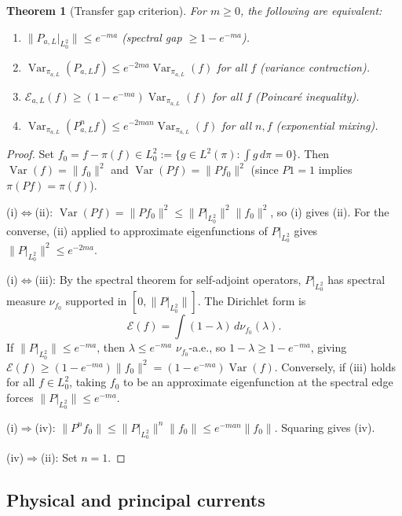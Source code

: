 \documentclass[12pt]{article}
\theoremstyle{plain}
\newtheorem{theorem}{Theorem}[section]
\theoremstyle{definition}
\numberwithin{equation}{section}
\newcommand{\Var}{\operatorname{Var}}
\begin{document}
\begin{theorem}[Transfer gap criterion]\label{thm:transfergap}
For $m\geq 0$, the following are equivalent:
\begin{enumerate}[label=(\roman*)]
\item $\|P_{a,L}|_{L^2_0}\|\leq e^{-ma}$ (spectral gap $\geq 1-e^{-ma}$).
\item $\Var_{\pi_{a,L}}(P_{a,L}f)\leq e^{-2ma}\Var_{\pi_{a,L}}(f)$ for all $f$ (variance contraction).
\item $\mathcal{E}_{a,L}(f)\geq(1-e^{-ma})\Var_{\pi_{a,L}}(f)$ for all $f$ (Poincar\'e inequality).
\item $\Var_{\pi_{a,L}}(P_{a,L}^n f)\leq e^{-2man}\Var_{\pi_{a,L}}(f)$ for all $n,f$ (exponential mixing).
\end{enumerate}
\end{theorem}

\begin{proof}
Set $f_0=f-\pi(f)\in L^2_0:=\{g\in L^2(\pi):\int g\,d\pi=0\}$.  Then $\Var(f)=\|f_0\|^2$ and $\Var(Pf)=\|Pf_0\|^2$ (since $P1=1$ implies $\pi(Pf)=\pi(f)$).

(i)$\Leftrightarrow$(ii): $\Var(Pf)=\|Pf_0\|^2\leq\|P|_{L^2_0}\|^2\|f_0\|^2$, so (i) gives (ii).  For the converse, (ii) applied to approximate eigenfunctions of $P|_{L^2_0}$ gives $\|P|_{L^2_0}\|^2\leq e^{-2ma}$.

(i)$\Leftrightarrow$(iii): By the spectral theorem for self-adjoint operators, $P|_{L^2_0}$ has spectral measure $\nu_{f_0}$ supported in $[0,\|P|_{L^2_0}\|]$.  The Dirichlet form is
\begin{equation}
\mathcal{E}(f) = \int(1-\lambda)\,d\nu_{f_0}(\lambda).
\end{equation}
If $\|P|_{L^2_0}\|\leq e^{-ma}$, then $\lambda\leq e^{-ma}$ $\nu_{f_0}$-a.e., so $1-\lambda\geq 1-e^{-ma}$, giving $\mathcal{E}(f)\geq(1-e^{-ma})\|f_0\|^2=(1-e^{-ma})\Var(f)$.  Conversely, if (iii) holds for all $f\in L^2_0$, taking $f_0$ to be an approximate eigenfunction at the spectral edge forces $\|P|_{L^2_0}\|\leq e^{-ma}$.

(i)$\Rightarrow$(iv): $\|P^n f_0\|\leq\|P|_{L^2_0}\|^n\|f_0\|\leq e^{-man}\|f_0\|$.  Squaring gives (iv).

(iv)$\Rightarrow$(ii): Set $n=1$.
\end{proof}

\subsection{Physical and principal currents}
\end{document}
